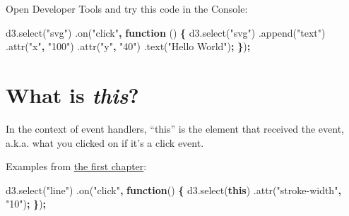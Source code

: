 \documentclass[openany]{book}
\newenvironment{Shaded}{\begin{snugshade}}{\end{snugshade}}
\newcommand{\AttributeTok}[1]{\textcolor[rgb]{0.77,0.63,0.00}{#1}}
\newcommand{\KeywordTok}[1]{\textcolor[rgb]{0.13,0.29,0.53}{\textbf{#1}}}
\newcommand{\NormalTok}[1]{#1}
\newcommand{\OperatorTok}[1]{\textcolor[rgb]{0.81,0.36,0.00}{\textbf{#1}}}
\newcommand{\StringTok}[1]{\textcolor[rgb]{0.31,0.60,0.02}{#1}}
\newcommand{\VariableTok}[1]{\textcolor[rgb]{0.00,0.00,0.00}{#1}}
\begin{document}
Open Developer Tools and try this code in the Console:

\begin{Shaded}
\begin{Highlighting}[]
\VariableTok{d3}\NormalTok{.}\AttributeTok{select}\NormalTok{(}\StringTok{"svg"}\NormalTok{)}
\NormalTok{  .}\AttributeTok{on}\NormalTok{(}\StringTok{"click"}\OperatorTok{,} \KeywordTok{function}\NormalTok{ () }\OperatorTok{\{}
    \VariableTok{d3}\NormalTok{.}\AttributeTok{select}\NormalTok{(}\StringTok{"svg"}\NormalTok{)}
\NormalTok{      .}\AttributeTok{append}\NormalTok{(}\StringTok{"text"}\NormalTok{)}
\NormalTok{        .}\AttributeTok{attr}\NormalTok{(}\StringTok{"x"}\OperatorTok{,} \StringTok{"100"}\NormalTok{)}
\NormalTok{        .}\AttributeTok{attr}\NormalTok{(}\StringTok{"y"}\OperatorTok{,} \StringTok{"40"}\NormalTok{)}
\NormalTok{        .}\AttributeTok{text}\NormalTok{(}\StringTok{"Hello World"}\NormalTok{)}\OperatorTok{;}
        \OperatorTok{\}}\NormalTok{)}\OperatorTok{;}
\end{Highlighting}
\end{Shaded}

\hypertarget{what-is-this}{%
\section{\texorpdfstring{What is \emph{this}?}{What is this?}}\label{what-is-this}}

In the context of event handlers, ``this'' is the element that received the event, a.k.a. what you clicked on if it's a click event.

Examples from \href{jump.html\#interactivity}{the first chapter}:

\begin{Shaded}
\begin{Highlighting}[]
\VariableTok{d3}\NormalTok{.}\AttributeTok{select}\NormalTok{(}\StringTok{"line"}\NormalTok{)}
\NormalTok{  .}\AttributeTok{on}\NormalTok{(}\StringTok{"click"}\OperatorTok{,} \KeywordTok{function}\NormalTok{() }\OperatorTok{\{}
    \VariableTok{d3}\NormalTok{.}\AttributeTok{select}\NormalTok{(}\KeywordTok{this}\NormalTok{)}
\NormalTok{      .}\AttributeTok{attr}\NormalTok{(}\StringTok{"stroke-width"}\OperatorTok{,} \StringTok{"10"}\NormalTok{)}\OperatorTok{;}
      \OperatorTok{\}}\NormalTok{)}\OperatorTok{;}
\end{Highlighting}
\end{Shaded}
\end{document}

